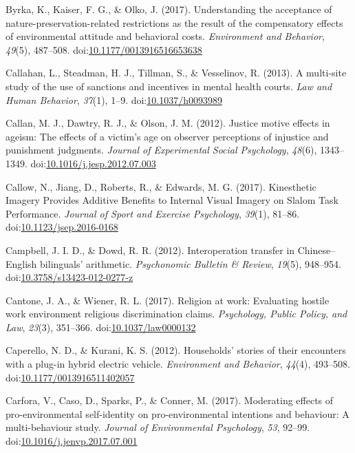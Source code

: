 \documentclass[english,man]{apa6}
\begin{document}
\hypertarget{ref-Byrka2017}{}
Byrka, K., Kaiser, F. G., \& Olko, J. (2017). Understanding the
acceptance of nature-preservation-related restrictions as the result of
the compensatory effects of environmental attitude and behavioral costs.
\emph{Environment and Behavior}, \emph{49}(5), 487--508.
doi:\href{https://doi.org/10.1177/0013916516653638}{10.1177/0013916516653638}

\hypertarget{ref-Callahan2013}{}
Callahan, L., Steadman, H. J., Tillman, S., \& Vesselinov, R. (2013). A
multi-site study of the use of sanctions and incentives in mental health
courts. \emph{Law and Human Behavior}, \emph{37}(1), 1--9.
doi:\href{https://doi.org/10.1037/h0093989}{10.1037/h0093989}

\hypertarget{ref-Callan2012}{}
Callan, M. J., Dawtry, R. J., \& Olson, J. M. (2012). Justice motive
effects in ageism: The effects of a victim's age on observer perceptions
of injustice and punishment judgments. \emph{Journal of Experimental
Social Psychology}, \emph{48}(6), 1343--1349.
doi:\href{https://doi.org/10.1016/j.jesp.2012.07.003}{10.1016/j.jesp.2012.07.003}

\hypertarget{ref-Callow2017a}{}
Callow, N., Jiang, D., Roberts, R., \& Edwards, M. G. (2017).
Kinesthetic Imagery Provides Additive Benefits to Internal Visual
Imagery on Slalom Task Performance. \emph{Journal of Sport and Exercise
Psychology}, \emph{39}(1), 81--86.
doi:\href{https://doi.org/10.1123/jsep.2016-0168}{10.1123/jsep.2016-0168}

\hypertarget{ref-Campbell2012}{}
Campbell, J. I. D., \& Dowd, R. R. (2012). Interoperation transfer in
Chinese--English bilinguals' arithmetic. \emph{Psychonomic Bulletin \&
Review}, \emph{19}(5), 948--954.
doi:\href{https://doi.org/10.3758/s13423-012-0277-z}{10.3758/s13423-012-0277-z}

\hypertarget{ref-Cantone2017}{}
Cantone, J. A., \& Wiener, R. L. (2017). Religion at work: Evaluating
hostile work environment religious discrimination claims.
\emph{Psychology, Public Policy, and Law}, \emph{23}(3), 351--366.
doi:\href{https://doi.org/10.1037/law0000132}{10.1037/law0000132}

\hypertarget{ref-Caperello2012}{}
Caperello, N. D., \& Kurani, K. S. (2012). Households' stories of their
encounters with a plug-in hybrid electric vehicle. \emph{Environment and
Behavior}, \emph{44}(4), 493--508.
doi:\href{https://doi.org/10.1177/0013916511402057}{10.1177/0013916511402057}

\hypertarget{ref-Carfora2017}{}
Carfora, V., Caso, D., Sparks, P., \& Conner, M. (2017). Moderating
effects of pro-environmental self-identity on pro-environmental
intentions and behaviour: A multi-behaviour study. \emph{Journal of
Environmental Psychology}, \emph{53}, 92--99.
doi:\href{https://doi.org/10.1016/j.jenvp.2017.07.001}{10.1016/j.jenvp.2017.07.001}
\end{document}
